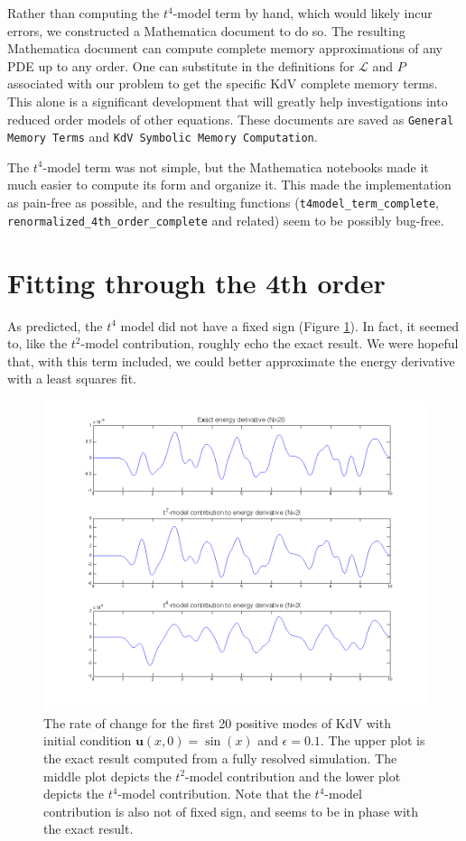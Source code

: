 \documentclass{article}
\begin{document}
Rather than computing the $t^4$-model term by hand, which would likely incur errors, we constructed a Mathematica document to do so. The resulting Mathematica document can compute complete memory approximations of any PDE up to any order. One can substitute in the definitions for $\mathcal{L}$ and $P$ associated with our problem to get the specific KdV complete memory terms. This alone is a significant development that will greatly help investigations into reduced order models of other equations. These documents are saved as \verb!General Memory Terms! and \verb!KdV Symbolic Memory Computation!.

The $t^4$-model term was not simple, but the Mathematica notebooks made it much easier to compute its form and organize it. This made the implementation as pain-free as possible, and the resulting functions (\verb!t4model_term_complete!, \verb!renormalized_4th_order_complete! and related) seem to be possibly bug-free.

\section{Fitting through the 4th order}

As predicted, the $t^4$ model did not have a fixed sign (Figure \ref{fig:energy_deriv_4}). In fact, it seemed to, like the $t^2$-model contribution, roughly echo the exact result. We were hopeful that, with this term included, we could better approximate the energy derivative with a least squares fit.

\begin{figure}[h]
\includegraphics[width=\textwidth]{comparing_derivatives_2.png}
\caption{The rate of change for the first 20 positive modes of KdV with initial condition $\mathbf{u}(x,0) = \sin(x)$ and $\epsilon=0.1$. The upper plot is the exact result computed from a fully resolved simulation. The middle plot depicts the $t^2$-model contribution and the lower plot depicts the $t^4$-model contribution. Note that the $t^4$-model contribution is also not of fixed sign, and seems to be in phase with the exact result.}\label{fig:energy_deriv_4}
\end{figure}
\end{document}

